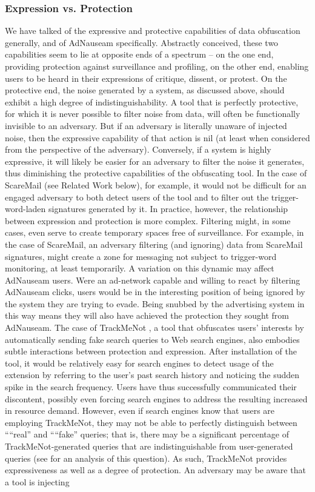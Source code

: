 \documentclass[conference]{IEEEtran}
\begin{document}
\subsubsection{Expression vs. Protection}

We have talked of the expressive and protective capabilities of data obfuscation generally, and of AdNauseam specifically. Abstractly conceived, these two capabilities seem to lie at opposite ends of a spectrum -- on the one end, providing protection against surveillance and profiling, on the other end, enabling users to be heard in their expressions of critique, dissent, or protest. On the protective end, the noise generated by a system, as discussed above, should exhibit a high degree of indistinguishability. A tool that is perfectly protective, for which it is never possible to filter noise from data, will often be functionally invisible to an adversary. But if an adversary is literally unaware of injected noise, then the expressive capability of that action is nil (at least when considered from the perspective of the adversary). Conversely, if a system is highly expressive, it will likely be easier for an adversary to filter the noise it generates, thus diminishing the protective capabilities of the obfuscating tool. In the case of ScareMail (see Related Work below), for example, it would not be difficult for an engaged adversary to both detect users of the tool and to filter out the trigger-word-laden signatures generated by it. In practice, however, the relationship between expression and protection is more complex. Filtering might, in some cases, even serve to create temporary spaces free of surveillance. For example, in the case of ScareMail, an adversary filtering (and ignoring) data from ScareMail signatures, might create a zone for messaging not subject to trigger-word monitoring, at least temporarily. A variation on this dynamic may affect AdNauseam users. Were an ad-network capable and willing to react by filtering AdNauseam clicks, users would be in the interesting position of being ignored by the system they are trying to evade. Being snubbed by the advertising system in this way means they will also have achieved the protection they sought from AdNauseam. The case of TrackMeNot \cite{Howe-2}, a tool that obfuscates users' interests by automatically sending fake search queries to Web search engines, also embodies subtle interactions between protection and expression. After installation of the tool, it would be relatively easy for search engines to detect usage of the extension by referring to the user's past search history and noticing the sudden spike in the search frequency. Users have thus successfully communicated their discontent, possibly even forcing search engines to address the resulting increased in resource demand. However, even if search engines know that users are employing TrackMeNot, they may not be able to perfectly distinguish between ““real” and ““fake” queries; that is, there may be a significant percentage of TrackMeNot-generated queries that are indistinguishable from user-generated queries (see \cite{Gervais} for an analysis of this question). As such, TrackMeNot provides expressiveness as well as a degree of protection. An adversary may be aware that a tool is injecting 
\end{document}
